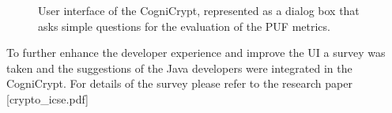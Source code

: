 \begin{figure}
\centering
{}
\caption{User interface of the CogniCrypt, represented as a dialog box that asks simple questions for the evaluation of the PUF metrics.}
\label{img:cogni_ui}
\end{figure}

To further enhance the developer experience and improve the UI a survey was taken and the suggestions of the Java developers were integrated in the CogniCrypt. For details of the survey please refer to the research paper [crypto\_icse.pdf]

